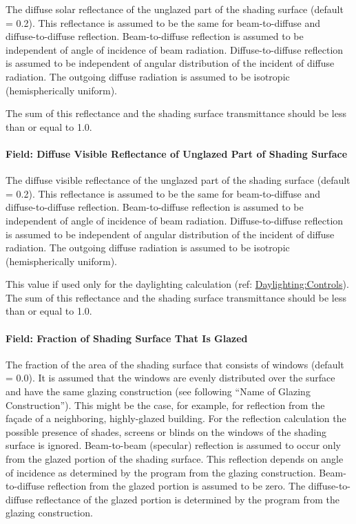 The diffuse solar reflectance of the unglazed part of the shading surface (default = 0.2). This reflectance is assumed to be the same for beam-to-diffuse and diffuse-to-diffuse reflection. Beam-to-diffuse reflection is assumed to be independent of angle of incidence of beam radiation. Diffuse-to-diffuse reflection is assumed to be independent of angular distribution of the incident of diffuse radiation. The outgoing diffuse radiation is assumed to be isotropic (hemispherically uniform).

The sum of this reflectance and the shading surface transmittance should be less than or equal to 1.0.

\paragraph{Field: Diffuse Visible Reflectance of Unglazed Part of Shading Surface}\label{field-diffuse-visible-reflectance-of-unglazed-part-of-shading-surface}

The diffuse visible reflectance of the unglazed part of the shading surface (default = 0.2). This reflectance is assumed to be the same for beam-to-diffuse and diffuse-to-diffuse reflection. Beam-to-diffuse reflection is assumed to be independent of angle of incidence of beam radiation. Diffuse-to-diffuse reflection is assumed to be independent of angular distribution of the incident of diffuse radiation. The outgoing diffuse radiation is assumed to be isotropic (hemispherically uniform).

This value if used only for the daylighting calculation (ref: \hyperref[daylightingcontrols-000]{Daylighting:Controls}). The sum of this reflectance and the shading surface transmittance should be less than or equal to 1.0.

\paragraph{Field: Fraction of Shading Surface That Is Glazed}\label{field-fraction-of-shading-surface-that-is-glazed}

The fraction of the area of the shading surface that consists of windows (default = 0.0). It is assumed that the windows are evenly distributed over the surface and have the same glazing construction (see following ``Name of Glazing Construction''). This might be the case, for example, for reflection from the façade of a neighboring, highly-glazed building. For the reflection calculation the possible presence of shades, screens or blinds on the windows of the shading surface is ignored. Beam-to-beam (specular) reflection is assumed to occur only from the glazed portion of the shading surface. This reflection depends on angle of incidence as determined by the program from the glazing construction. Beam-to-diffuse reflection from the glazed portion is assumed to be zero. The diffuse-to-diffuse reflectance of the glazed portion is determined by the program from the glazing construction.

